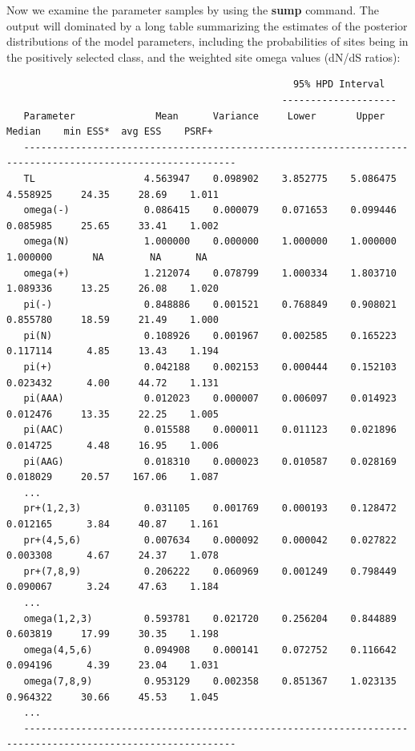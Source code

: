 \documentclass[12pt]{book}
\begin{document}
Now we examine the parameter samples by using the \textbf{sump} command. The output will dominated by a long
table summarizing the estimates of the posterior distributions of the model parameters, including the probabilities
of sites being in the positively selected class, and the weighted site omega values (dN/dS ratios):


\begin{singlespacing}
\tiny
\begin{verbatim}
                                                  95% HPD Interval
                                                --------------------
   Parameter              Mean      Variance     Lower       Upper       Median    min ESS*  avg ESS    PSRF+ 
   -----------------------------------------------------------------------------------------------------------
   TL                   4.563947    0.098902    3.852775    5.086475    4.558925     24.35     28.69    1.011
   omega(-)             0.086415    0.000079    0.071653    0.099446    0.085985     25.65     33.41    1.002
   omega(N)             1.000000    0.000000    1.000000    1.000000    1.000000       NA        NA      NA   
   omega(+)             1.212074    0.078799    1.000334    1.803710    1.089336     13.25     26.08    1.020
   pi(-)                0.848886    0.001521    0.768849    0.908021    0.855780     18.59     21.49    1.000
   pi(N)                0.108926    0.001967    0.002585    0.165223    0.117114      4.85     13.43    1.194
   pi(+)                0.042188    0.002153    0.000444    0.152103    0.023432      4.00     44.72    1.131
   pi(AAA)              0.012023    0.000007    0.006097    0.014923    0.012476     13.35     22.25    1.005
   pi(AAC)              0.015588    0.000011    0.011123    0.021896    0.014725      4.48     16.95    1.006
   pi(AAG)              0.018310    0.000023    0.010587    0.028169    0.018029     20.57    167.06    1.087
   ...
   pr+(1,2,3)           0.031105    0.001769    0.000193    0.128472    0.012165      3.84     40.87    1.161
   pr+(4,5,6)           0.007634    0.000092    0.000042    0.027822    0.003308      4.67     24.37    1.078
   pr+(7,8,9)           0.206222    0.060969    0.001249    0.798449    0.090067      3.24     47.63    1.184
   ...
   omega(1,2,3)         0.593781    0.021720    0.256204    0.844889    0.603819     17.99     30.35    1.198
   omega(4,5,6)         0.094908    0.000141    0.072752    0.116642    0.094196      4.39     23.04    1.031
   omega(7,8,9)         0.953129    0.002358    0.851367    1.023135    0.964322     30.66     45.53    1.045
   ...
   -----------------------------------------------------------------------------------------------------------
\end{verbatim}
\normalsize
\end{singlespacing}
\end{document}
